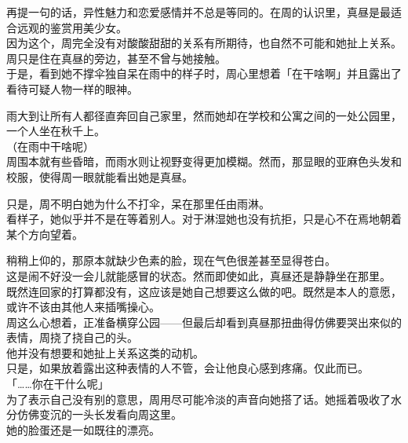 再提一句的话，异性魅力和恋爱感情并不总是等同的。在周的认识里，真昼是最适合远观的鉴赏用美少女。\\

因为这个，周完全没有对酸酸甜甜的关系有所期待，也自然不可能和她扯上关系。周只是住在真昼的旁边，甚至不曾与她接触。\\

于是，看到她不撑伞独自呆在雨中的样子时，周心里想着「在干啥啊」并且露出了看待可疑人物一样的眼神。\\

\vspace{2\baselineskip}

雨大到让所有人都径直奔回自己家里，然而她却在学校和公寓之间的一处公园里，一个人坐在秋千上。\\

（在雨中干啥呢）\\

周围本就有些昏暗，而雨水则让视野变得更加模糊。然而，那显眼的亚麻色头发和校服，使得周一眼就能看出她是真昼。

只是，周不明白她为什么不打伞，呆在那里任由雨淋。\\

看样子，她似乎并不是在等着别人。对于淋湿她也没有抗拒，只是心不在焉地朝着某个方向望着。

稍稍上仰的，那原本就缺少色素的脸，现在气色很差甚至显得苍白。\\

这是闹不好没一会儿就能感冒的状态。然而即使如此，真昼还是静静坐在那里。\\

既然连回家的打算都没有，这应该是她自己想要这么做的吧。既然是本人的意愿，或许不该由其他人来插嘴操心。\\

周这么心想着，正准备横穿公园——但最后却看到真昼那扭曲得仿佛要哭出來似的表情，周挠了挠自己的头。\\

他并没有想要和她扯上关系这类的动机。\\

只是，如果放着露出这种表情的人不管，会让他良心感到疼痛。仅此而已。\\

「……你在干什么呢」\\

为了表示自己没有别的意思，周用尽可能冷淡的声音向她搭了话。她摇着吸收了水分仿佛变沉的一头长发看向周这里。\\

她的脸蛋还是一如既往的漂亮。

